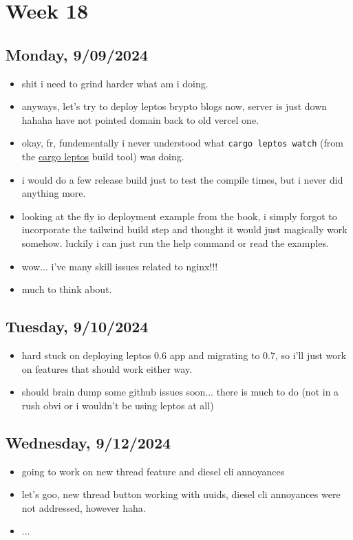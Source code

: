 \newpage
\section{Week 18}

\subsection*{Monday, 9/09/2024}
\begin{itemize}
    \item shit i need to grind harder what am i doing.
    \item anyways, let's try to deploy leptos brypto blogs now, server is just
        down hahaha have not pointed domain back to old vercel one.
    \item okay, fr, fundementally i never understood what \texttt{cargo leptos
        watch} (from the  
        \textcolor{blue}{\href{https://github.com/leptos-rs/cargo-leptos}{cargo leptos}}
        build tool) was doing.
    \item i would do a few release build just to test the compile times, but i
        never did anything more.
    \item looking at the fly io deployment example from the book, i simply
        forgot to incorporate the tailwind build step and thought it would just
        magically work somehow. luckily i can just run the help command or read
        the examples.
    \item wow... i've many skill issues related to nginx!!!
    \item much to think about.
\end{itemize}

\subsection*{Tuesday, 9/10/2024}
\begin{itemize}
    \item hard stuck on deploying leptos 0.6 app and migrating to 0.7, so i'll
        just work on features that should work either way.
    \item should brain dump some github issues soon... there is much to do (not 
        in a rush obvi or i wouldn't be using leptos at all)
\end{itemize}

\subsection*{Wednesday, 9/12/2024}
\begin{itemize}
    \item going to work on new thread feature and diesel cli annoyances
    \item let's goo, new thread button working with uuids, diesel cli annoyances
        were not addressed, however haha.
    \item ...
\end{itemize}
